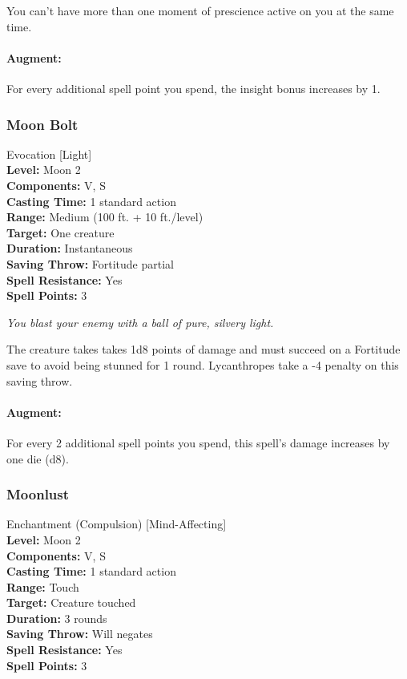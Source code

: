 You can't have more than one moment of prescience active on you at the same time. 

\paragraph{Augment:} For every additional spell point you spend, the insight bonus increases by 1.
\subsubsection{Moon Bolt}
\label{Spell:MoonBolt}
Evocation [Light]
\\ \textbf{Level:} Moon 2
\\ \textbf{Components:} V, S
\\ \textbf{Casting Time:} 1 standard action
\\ \textbf{Range:} Medium (100 ft. + 10 ft./level)
\\ \textbf{Target:} One creature
\\ \textbf{Duration:} Instantaneous
\\ \textbf{Saving Throw:} Fortitude partial
\\ \textbf{Spell Resistance:} Yes
\\ \textbf{Spell Points:} 3

\emph{You blast your enemy with a ball of pure, silvery light.}

The creature takes takes 1d8 points of damage and must succeed on a Fortitude save to avoid being stunned for 1 round. Lycanthropes take a -4 penalty on this saving throw.

\paragraph{Augment:} For every 2 additional spell points you spend, this spell's damage increases by one die (d8).
\subsubsection{Moonlust}
\label{Spell:Moonlust}
Enchantment (Compulsion) [Mind-Affecting]
\\ \textbf{Level:} Moon 2
\\ \textbf{Components:} V, S
\\ \textbf{Casting Time:} 1 standard action
\\ \textbf{Range:} Touch
\\ \textbf{Target:} Creature touched
\\ \textbf{Duration:} 3 rounds
\\ \textbf{Saving Throw:} Will negates
\\ \textbf{Spell Resistance:} Yes
\\ \textbf{Spell Points:} 3

